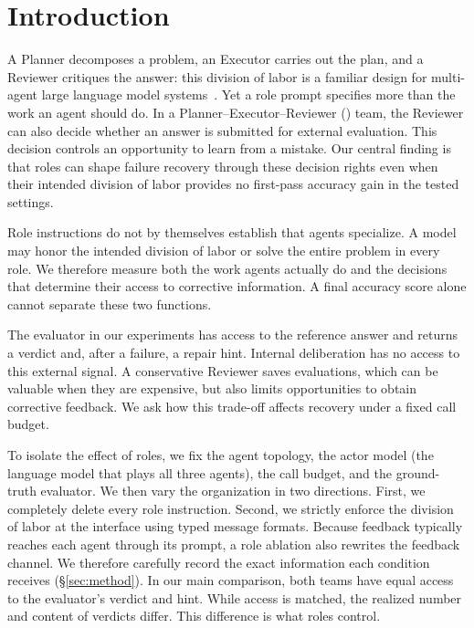 \section{Introduction}
\label{sec:intro}

A Planner decomposes a problem, an Executor carries out the plan, and a
Reviewer critiques the answer: this division of labor is a familiar design
for multi-agent large language model systems~\cite{hong2024metagpt,qian2024chatdev,wu2024autogen}.
Yet a role prompt specifies more than the work an agent should do. In a
Planner--Executor--Reviewer (\PER{}) team, the Reviewer can also decide
whether an answer is submitted for external evaluation. This decision
controls an opportunity to learn from a mistake. Our central finding is that
roles can shape failure recovery through these decision rights even when
their intended division of labor provides no first-pass accuracy gain in
the tested settings.

Role instructions do not by themselves establish that agents specialize.
A model may honor the intended division of labor or solve the entire
problem in every role. We therefore measure both the work agents actually
do and the decisions that determine their access to corrective information.
A final accuracy score alone cannot separate these two functions.

The evaluator in our experiments has access to the reference answer and
returns a verdict and, after a failure, a repair hint. Internal deliberation
has no access to this external signal. A conservative Reviewer saves
evaluations, which can be valuable when they are expensive, but also limits
opportunities to obtain corrective feedback. We ask how this trade-off
affects recovery under a fixed call budget.

To isolate the effect of roles, we fix the agent topology, the actor model
(the language model that plays all three agents), the call budget, and the
ground-truth evaluator. We then vary the organization in two directions.
First, we completely delete every role instruction. Second, we strictly
enforce the division of labor at the interface using typed message formats.
Because feedback typically reaches each agent through its prompt, a role
ablation also rewrites the feedback channel. We therefore carefully record
the exact information each condition receives (\S\ref{sec:method}). In our
main comparison, both teams have equal access to the evaluator's verdict
and hint. While access is matched, the realized number and content of
verdicts differ. This difference is what roles control.

